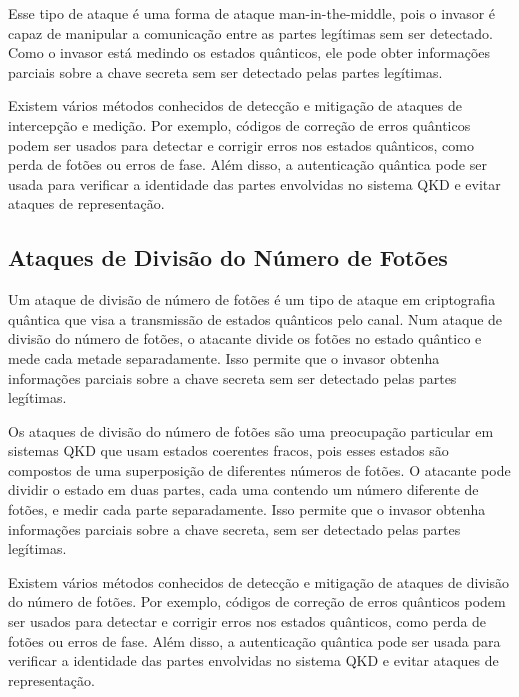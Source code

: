 Esse tipo de ataque é uma forma de ataque man-in-the-middle, pois o invasor é capaz de manipular a comunicação entre as partes legítimas sem ser detectado. Como o invasor está medindo os estados quânticos, ele pode obter informações parciais sobre a chave secreta sem ser detectado pelas partes legítimas.

Existem vários métodos conhecidos de detecção e mitigação de ataques de intercepção e medição. Por exemplo, códigos de correção de erros quânticos podem ser usados para detectar e corrigir erros nos estados quânticos, como perda de fotões ou erros de fase. Além disso, a autenticação quântica pode ser usada para verificar a identidade das partes envolvidas no sistema QKD e evitar ataques de representação.

\subsection{Ataques de Divisão do Número de Fotões}

Um ataque de divisão de número de fotões é um tipo de ataque em criptografia quântica que visa a transmissão de estados quânticos pelo canal. Num ataque de divisão do número de fotões, o atacante divide os fotões no estado quântico e mede cada metade separadamente. Isso permite que o invasor obtenha informações parciais sobre a chave secreta sem ser detectado pelas partes legítimas.

Os ataques de divisão do número de fotões são uma preocupação particular em sistemas QKD que usam estados coerentes fracos, pois esses estados são compostos de uma superposição de diferentes números de fotões. O atacante pode dividir o estado em duas partes, cada uma contendo um número diferente de fotões, e medir cada parte separadamente. Isso permite que o invasor obtenha informações parciais sobre a chave secreta, sem ser detectado pelas partes legítimas.

Existem vários métodos conhecidos de detecção e mitigação de ataques de divisão do número de fotões. Por exemplo, códigos de correção de erros quânticos podem ser usados para detectar e corrigir erros nos estados quânticos, como perda de fotões ou erros de fase. Além disso, a autenticação quântica pode ser usada para verificar a identidade das partes envolvidas no sistema QKD e evitar ataques de representação.

